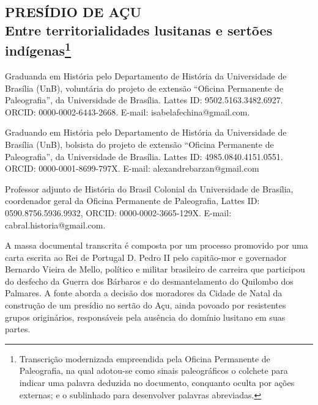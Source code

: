 \begin{refsection}
    \renewcommand{\thefigure}{\arabic{figure}}

    \chapter[Presídio de Açu: {\itshape{}entre territorialidades lusitanas e sertões indígenas}]{PRESÍDIO DE AÇU\\Entre territorialidades lusitanas e sertões indígenas\footnote{Transcrição modernizada empreendida pela Oficina Permanente de Paleografia, na qual adotou-se como sinais paleográficos o colchete para indicar uma palavra deduzida no documento, conquanto oculta por ações externas; e o sublinhado para desenvolver palavras abreviadas.}}%

    \label{chap:presidio-de-acu}
    
    {Graduanda em História pelo Departamento de História da Universidade de Brasília (UnB), voluntária do projeto de extensão “Oficina Permanente de Paleografia”, da Universidade de Brasília. Lattes ID: 9502.5163.3482.6927. ORCID: 0000-0002-6443-2668. E-mail: isabelafechina@gmail.com.}

    {Graduando em História pelo Departamento de História da Universidade de Brasília (UnB), bolsista do projeto de extensão “Oficina Permanente de Paleografia”, da Universidade de Brasília. Lattes ID: 4985.0840.4151.0551. ORCID: 0000-0001-8699-797X. E-mail: alexandrebarzan@gmail.com}

    {Professor adjunto de História do Brasil Colonial da Universidade de Brasília, coordenador geral da Oficina Permanente de Paleografia, Lattes ID: 0590.8756.5936.9932, ORCID: 0000-0002-3665-129X. E-mail: cabral.historia@gmail.com.}

    \vspace{5mm}

    A massa  documental transcrita é composta por um processo promovido por uma carta escrita ao Rei de Portugal D. Pedro II pelo capitão-mor e governador Bernardo Vieira de Mello, político e militar brasileiro de carreira que participou do desfecho da Guerra dos Bárbaros e do desmantelamento do Quilombo dos Palmares. A fonte aborda a decisão dos moradores da Cidade de Natal da construção de um presídio no sertão do Açu, ainda povoado por resistentes grupos originários, responsáveis pela ausência do domínio lusitano em suas partes. 


\end{refsection}
